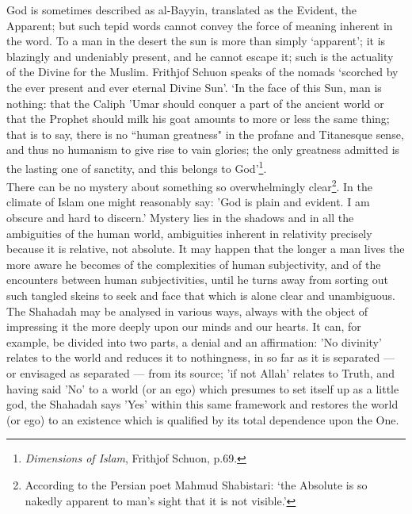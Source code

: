 \documentclass[10pt, twoside,openright]{book}
\begin{document}
God is sometimes described as al\hyp{}Bayyin, translated as the Evident, the Apparent; but such tepid 
words cannot convey the force of meaning inherent in the word. To a man in the desert the sun is more 
than simply `apparent'; it is blazingly and undeniably present, and he cannot escape it; such is the 
actuality of the Divine for the Muslim. Frithjof Schuon speaks of the nomads `scorched by the ever 
present and ever eternal Divine Sun'. `In the face of this Sun, man is nothing: that the Caliph 'Umar 
should conquer a part of the ancient world or that the Prophet should milk his goat amounts to more 
or less the same thing; that is to say, there is no ``human greatness" in the profane and Titanesque 
sense, and thus no humanism to give rise to vain glories; the only greatness admitted is the lasting 
one of sanctity, and this belongs to God'\footnote{\emph{Dimensions of Islam}, Frithjof Schuon, p.69.}. \\

There can be no mystery about something so overwhelmingly clear\footnote{According to the Persian poet Mahmud Shabistari: `the Absolute is so nakedly apparent to man's sight that it is not visible.'}. In the climate of Islam one might reasonably say: 'God is plain and evident. I am obscure and hard to discern.' Mystery lies in the shadows and in all the ambiguities of the human world, ambiguities inherent in relativity precisely because it is relative, not absolute. It may happen that the longer a man lives the more aware he 
becomes of the complexities of human subjectivity, and of the encounters between human 
subjectivities, until he turns away from sorting out such tangled skeins to seek and face that which 
is alone clear and unambiguous. \\

The Shahadah may be analysed in various ways, always with the object of impressing it the more deeply 
upon our minds and our hearts. It can, for example, be divided into two parts, a denial and an 
affirmation: 'No divinity' relates to the world and reduces it to nothingness, in so far as it is 
separated --- or envisaged as separated --- from its source; 'if not Allah' relates to Truth, and having 
said 'No' to a world (or an ego) which presumes to set itself up as a little god, the Shahadah says 
'Yes' within this same framework and restores the world (or ego) to an existence which is qualified 
by its total dependence upon the One. \\
\end{document}
